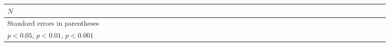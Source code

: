 {\begin{tabular}{l*{54}{c}}
\(N\)       &                     &                     &                     &                     &                     &                     &                     &                     &                     &                     &                     &                     &                     &                     &                     &                     &                     &                     &                     &                     &                     &                     &                     &                     &                     &                     &                     &                     &                     &                     &                     &                     &                     &                     &                     &                     &                     &                     &                     &                     &                     &                     &                     &                     &                     &                     &                     &                     &                     &                     &                     &                     &                     &                     \\
\hline\hline
\multicolumn{55}{l}{\footnotesize Standard errors in parentheses}\\
\multicolumn{55}{l}{\footnotesize \sym{*} \(p<0.05\), \sym{**} \(p<0.01\), \sym{***} \(p<0.001\)}\\
\end{tabular}
}
